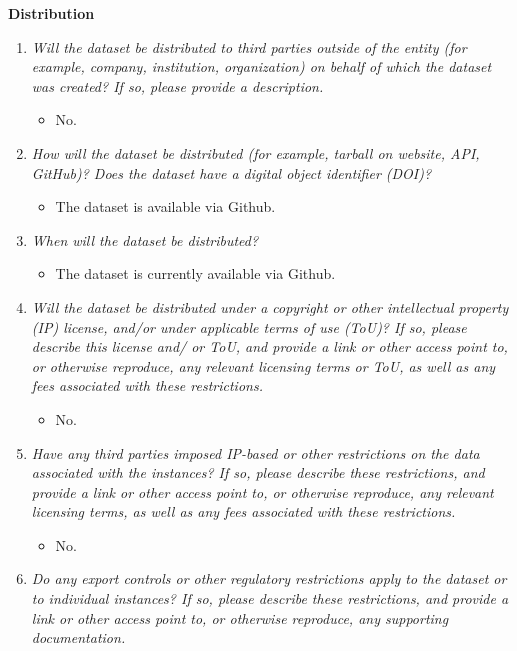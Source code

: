 \documentclass[
]{article}
\providecommand{\tightlist}{%
  \setlength{\itemsep}{0pt}\setlength{\parskip}{0pt}}
\begin{document}
\textbf{Distribution}

\begin{enumerate}
\def\labelenumi{\arabic{enumi}.}
\tightlist
\item
  \emph{Will the dataset be distributed to third parties outside of the entity (for example, company, institution, organization) on behalf of which the dataset was created? If so, please provide a description.}

  \begin{itemize}
  \tightlist
  \item
    No.
  \end{itemize}
\item
  \emph{How will the dataset be distributed (for example, tarball on website, API, GitHub)? Does the dataset have a digital object identifier (DOI)?}

  \begin{itemize}
  \tightlist
  \item
    The dataset is available via Github.
  \end{itemize}
\item
  \emph{When will the dataset be distributed?}

  \begin{itemize}
  \tightlist
  \item
    The dataset is currently available via Github.
  \end{itemize}
\item
  \emph{Will the dataset be distributed under a copyright or other intellectual property (IP) license, and/or under applicable terms of use (ToU)? If so, please describe this license and/ or ToU, and provide a link or other access point to, or otherwise reproduce, any relevant licensing terms or ToU, as well as any fees associated with these restrictions.}

  \begin{itemize}
  \tightlist
  \item
    No.
  \end{itemize}
\item
  \emph{Have any third parties imposed IP-based or other restrictions on the data associated with the instances? If so, please describe these restrictions, and provide a link or other access point to, or otherwise reproduce, any relevant licensing terms, as well as any fees associated with these restrictions.}

  \begin{itemize}
  \tightlist
  \item
    No.
  \end{itemize}
\item
  \emph{Do any export controls or other regulatory restrictions apply to the dataset or to individual instances? If so, please describe these restrictions, and provide a link or other access point to, or otherwise reproduce, any supporting documentation.}


\end{enumerate}
\end{document}
